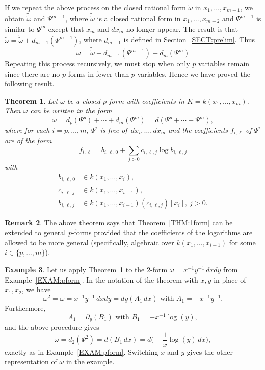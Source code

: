 \documentclass{amsart}
\newtheorem{thm}{Theorem}
\theoremstyle{definition}
\newtheorem{remark}[thm]{Remark}
\newtheorem{example}[thm]{Example}
\numberwithin{equation}{section}
\numberwithin{thm}{section}
\begin{document}
If we repeat the above process on the closed rational form $\widetilde{\omega}$ in $x_1,\dots,x_{m-1}$, we obtain $\widetilde{\widetilde{\omega}}$ and $\Psi^{m-1}$, where $\widetilde{\widetilde{\omega}}$ is a closed rational form in $x_1,\dots,x_{m-2}$ and $\Psi^{m-1}$ is similar to $\Psi^m$ except that $x_m$ and $dx_m$ no longer appear.  The result is that $\widetilde{\omega} = \widetilde{\widetilde{\omega}} + d_{m-1}(\Psi^{m-1})$, where $d_{m-1}$ is defined in Section~\ref{SECT:prelim}.  Thus
\[
\omega = \widetilde{\widetilde{\omega}} + d_{m-1}(\Psi^{m-1}) + d_m(\Psi^m)
\]
Repeating this process recursively, we must stop when only $p$ variables remain since there are no $p$-forms in fewer than $p$ variables.  Hence we have proved the following result.

\begin{thm}
\label{THM:pform}
Let $\omega$ be a closed $p$-form with coefficients in $K = k(x_1, \ldots, x_m)$. Then $\omega$ can be written in the form
\[
\omega = d_p(\Psi^p) + \cdots + d_m(\Psi^m) = d(\Psi^p + \cdots + \Psi^m),
\]
where for each $i =p, \ldots, m$, $\Psi^i$ is free of~$dx_i,\ldots,dx_m$ and the coefficients $f_{i, \ell}$ of $\Psi^i$ are of the form
\[
f_{i, \ell} =  b_{i, \ell, 0} + \sum_{j > 0} c_{i, \ell, j} \log b_{i, \ell, j}
\]
with
\begin{align*}
b_{i, \ell, 0} &\in k(x_1, \ldots, x_{i}),\\
c_{i, \ell, j} &\in \overline{k(x_1, \ldots, x_{i-1})},\\
b_{i, \ell, j} &\in k(x_1, \ldots, x_{i-1})(c_{i, \ell, j})[x_i],\ j > 0.
\end{align*}
\end{thm}

 \begin{remark}
The above theorem says that Theorem~\ref{THM:1form} can be extended to general $p$-forms provided that the coefficients of the logarithms are allowed to be more general (specifically, algebraic over $k(x_1,\dots,x_{i-1})$ for some $i \in \{p,\dots,m\}$).
 \end{remark}

\begin{example}\label{EXAM:1/xy}
Let us apply Theorem~\ref{THM:pform} to the $2$-form $\omega = x^{-1}y^{-1}\, dxdy$ from Example~\ref{EXAM:pform}.   In the notation of the theorem with $x,y$ in place of $x_1,x_2$, we have
\[
\omega^2 = \omega = x^{-1}y^{-1}\, dxdy = dy(A_1 \, dx) \text{ with } A_1 = -x^{-1}y^{-1}.
\]
Furthermore,
\[
A_1 = \partial_y(B_1) \text{ with } B_1 = -x^{-1} \log(y),
\]
and the above procedure gives
\[
\omega = d_2(\Psi^2) = d(B_1 \, dx) = d\Big({-}\frac{1}{x}\log(y)\, dx\Big),
\]
exactly as in  Example~\ref{EXAM:pform}. Switching $x$ and $y$ gives the other representation of $\omega$ in the example.
\end{example}
\end{document}
